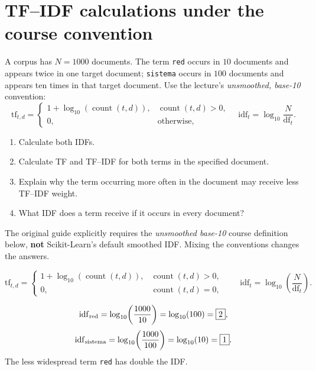 \section{TF--IDF calculations under the course convention}
\label{sec:ex11}
\begin{problem}
A corpus has $N=1000$ documents. The term \texttt{red} occurs in $10$ documents and appears twice in one target document; \texttt{sistema} occurs in $100$ documents and appears ten times in that target document. Use the lecture's \emph{unsmoothed, base-10} convention:
\[
\mathrm{tf}_{t,d}=\begin{cases}1+\log_{10}(\operatorname{count}(t,d)),&\operatorname{count}(t,d)>0,\\0,&\text{otherwise},\end{cases}
\quad \mathrm{idf}_t=\log_{10}\frac{N}{\mathrm{df}_t}.
\]
\begin{enumerate}[label=\textbf{(\alph*)}]
\item Calculate both IDFs.
\item Calculate TF and TF--IDF for both terms in the specified document.
\item Explain why the term occurring more often in the document may receive less TF--IDF weight.
\item What IDF does a term receive if it occurs in every document?
\end{enumerate}
\end{problem}


\begin{important}
The original guide explicitly requires the \emph{unsmoothed base-10} course definition below, \textbf{not} Scikit-Learn's default smoothed IDF. Mixing the conventions changes the answers.
\end{important}
\[
\mathrm{tf}_{t,d}=\begin{cases}
1+\log_{10}(\operatorname{count}(t,d)),&\operatorname{count}(t,d)>0,\\
0,&\operatorname{count}(t,d)=0,
\end{cases}\qquad
\mathrm{idf}_{t}=\log_{10}\!\left(\frac{N}{\mathrm{df}_{t}}\right).
\]

\[
\mathrm{idf}_{\rm red}=\log_{10}\!\left(\frac{1000}{10}\right)=\log_{10}(100)=\boxed{2},
\]
\[
\mathrm{idf}_{\rm sistema}=\log_{10}\!\left(\frac{1000}{100}\right)=\log_{10}(10)=\boxed{1}.
\]
The less widespread term \texttt{red} has double the IDF.

